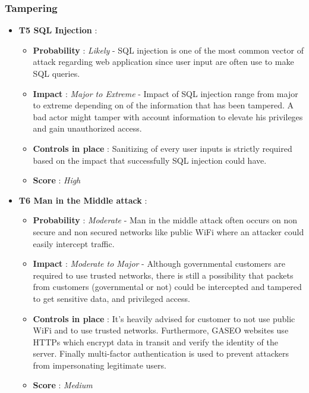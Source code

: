 \documentclass[12pt]{article}
\begin{document}
\subsubsection*{Tampering}
\begin{itemize}
    \item \textbf{ T5 SQL Injection }: 
        \begin{itemize}
            \item  \textbf{ Probability }: \textit{Likely} -  SQL injection is one of the most common vector of attack regarding web application since user input are often use to make SQL queries.
            \item  \textbf{ Impact }:  \textit{Major to Extreme} - Impact of SQL injection range from major to extreme depending on of the information that has been tampered. A bad actor might tamper with account information to elevate his privileges and gain unauthorized access.
            \item \textbf{ Controls in place }: Sanitizing of every user inputs is strictly required based on the impact that successfully SQL injection could have.
            \item \textbf{ Score } : \textit{High}
         \end{itemize}

    \item \textbf{ T6 Man in the Middle attack }: 
        \begin{itemize}
            \item  \textbf{ Probability }: \textit{Moderate} - Man in the middle attack often occurs on non secure and non secured networks like public WiFi where an attacker could easily intercept traffic.
            \item  \textbf{ Impact }:  \textit{Moderate to Major} - Although governmental customers are required to use trusted networks, there is still a possibility that packets from customers (governmental or not) could be intercepted and tampered to get sensitive data, and privileged access. 
            \item \textbf{ Controls in place }: It's heavily advised for customer to not use public WiFi and to use trusted networks. Furthermore, GASEO websites use HTTPs which encrypt data in transit and verify the identity of the server. Finally multi-factor authentication is used to prevent attackers from impersonating legitimate users.
            \item \textbf{ Score } : \textit{Medium}
         \end{itemize}
\end{itemize}
\end{document}
